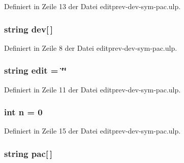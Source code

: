 Definiert in Zeile 13 der Datei editprev-\/dev-\/sym-\/pac.\+ulp.

\hypertarget{editprev-dev-sym-pac_8ulp_af87dd7ae8e527b31308923149d6841e1}{}
\subsubsection[{dev}]{\setlength{\rightskip}{0pt plus 5cm}string dev\mbox{[}$\,$\mbox{]}}\label{editprev-dev-sym-pac_8ulp_af87dd7ae8e527b31308923149d6841e1}


Definiert in Zeile 8 der Datei editprev-\/dev-\/sym-\/pac.\+ulp.

\hypertarget{editprev-dev-sym-pac_8ulp_a03c320515aeefc0c276c51607ca8a5eb}{}
\subsubsection[{edit}]{\setlength{\rightskip}{0pt plus 5cm}string edit = \char`\"{}\char`\"{}}\label{editprev-dev-sym-pac_8ulp_a03c320515aeefc0c276c51607ca8a5eb}


Definiert in Zeile 11 der Datei editprev-\/dev-\/sym-\/pac.\+ulp.

\hypertarget{editprev-dev-sym-pac_8ulp_a76f11d9a0a47b94f72c2d0e77fb32240}{}
\subsubsection[{n}]{\setlength{\rightskip}{0pt plus 5cm}int n = 0}\label{editprev-dev-sym-pac_8ulp_a76f11d9a0a47b94f72c2d0e77fb32240}


Definiert in Zeile 15 der Datei editprev-\/dev-\/sym-\/pac.\+ulp.

\hypertarget{editprev-dev-sym-pac_8ulp_aabdb88a547fddc24ea086330593761c2}{}
\subsubsection[{pac}]{\setlength{\rightskip}{0pt plus 5cm}string pac\mbox{[}$\,$\mbox{]}}\label{editprev-dev-sym-pac_8ulp_aabdb88a547fddc24ea086330593761c2}



